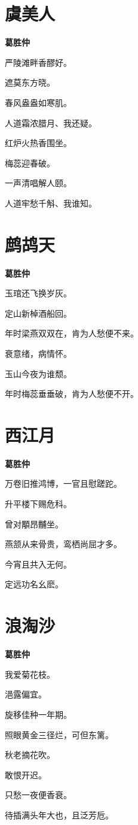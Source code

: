 \documentclass[12pt,a4paper]{ctexbook}
\begin{document}
\section{虞美人}
\textbf{葛胜仲}\par\vspace{0.5em}
严陵滩畔香醪好。\par
遮莫东方晓。\par
春风盎盎如寒肌。\par
人道霜浓腊月、我还疑。\par
红炉火热香围坐。\par
梅蕊迎春破。\par
一声清唱解人颐。\par
人道牢愁千斛、我谁知。\par

\section{鹧鸪天}
\textbf{葛胜仲}\par\vspace{0.5em}
玉琯还飞换岁灰。\par
定山新棹酒船回。\par
年时梁燕双双在，肯为人愁便不来。\par
衰意绪，病情怀。\par
玉山今夜为谁颓。\par
年时梅蕊垂垂破，肯为人愁便不开。\par

\section{西江月}
\textbf{葛胜仲}\par\vspace{0.5em}
万卷旧推鸿博，一官且慰蹉跎。\par
升平楼下赐危科。\par
曾对顒昂黼坐。\par
燕颔从来骨贵，鸾栖尚屈才多。\par
今宵且共入无何。\par
定远功名幺麽。\par

\section{浪淘沙}
\textbf{葛胜仲}\par\vspace{0.5em}
我爱菊花枝。\par
浥露偏宜。\par
旋移佳种一年期。\par
照眼黄金三径烂，可但东篱。\par
秋老摘花吹。\par
敢恨开迟。\par
只愁一夜便香衰。\par
待插满头年大也，且泛芳卮。\par
\end{document}
